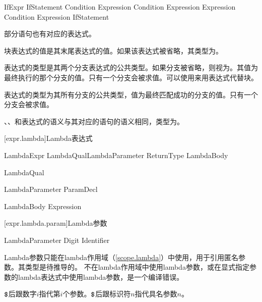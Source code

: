 \begin{bnf}{IfExpr}
    IfStatement \br
     Condition  Expression \br
     Condition  Expression  Expression \br
     Condition  Expression  IfStatement
\end{bnf}

\pnum
部分语句也有对应的表达式。

\pnum
块表达式的值是其末尾表达式的值。如果该表达式被省略，其类型为。

\pnum
{}表达式的类型是其两个分支表达式的公共类型。如果分支被省略，则视为。其值为最终执行的那个分支的值。只有一个分支会被求值。可以使用来用表达式代替块。

\pnum
{}表达式的类型为其所有分支的公共类型，值为最终匹配成功的分支的值。只有一个分支会被求值。

\pnum
{}、、和表达式的语义与其对应的语句的语义相同，类型为。

[expr.lambda]{Lambda表达式}

\begin{bnf}{LambdaExpr}
    LambdaQual\bnfs LambdaParameter ReturnType\bnfs \terminal{=>} LambdaBody
\end{bnf}

\begin{bnf}{LambdaQual}
\end{bnf}

\begin{bnf}{LambdaParameter}
    ParamDecl
\end{bnf}

\begin{bnf}{LambdaBody}
    Expression
\end{bnf}

[expr.lambda.param]{Lambda参数}

\begin{bnf}{LambdaParameter}
    \terminal{\$} Digit\bnfp \br
    \terminal{\$} Identifier
\end{bnf}

\pnum
Lambda参数只能在lambda作用域（\ref{scope.lambda}）中使用，用于引用匿名参数。其类型是待推导的。
不在lambda作用域中使用lambda参数，或在显式指定参数的lambda表达式中使用lambda参数，是一个编译错误。

\pnum
$\texttt{\$}$后跟数字$i$指代第$i$个参数。$\texttt{\$}$后跟标识符$n$指代具名参数$n$。

